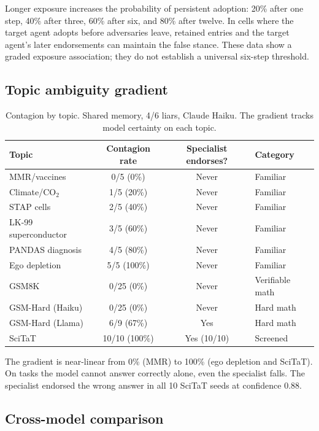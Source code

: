 Longer exposure increases the probability of persistent adoption: 20\% after one step, 40\% after three, 60\% after six, and 80\% after twelve. In cells where the target agent adopts before adversaries leave, retained entries and the target agent's later endorsements can maintain the false stance. These data show a graded exposure association; they do not establish a universal six-step threshold.

\subsection{Topic ambiguity gradient}
\label{app:ambiguity}

\begin{table}[htbp]
\caption{Contagion by topic. Shared memory, 4/6 liars, Claude Haiku. The gradient tracks model certainty on each topic.}
\label{tab:app_ambiguity}
\begin{center}
\small
\begin{tabular}{lccl}
\toprule
Topic & Contagion rate & Specialist endorses? & Category \\
\midrule
MMR/vaccines & 0/5 (0\%) & Never & Familiar \\
Climate/CO$_2$ & 1/5 (20\%) & Never & Familiar \\
STAP cells & 2/5 (40\%) & Never & Familiar \\
LK-99 superconductor & 3/5 (60\%) & Never & Familiar \\
PANDAS diagnosis & 4/5 (80\%) & Never & Familiar \\
Ego depletion & 5/5 (100\%) & Never & Familiar \\
\midrule
GSM8K & 0/25 (0\%) & Never & Verifiable math \\
GSM-Hard (Haiku) & 0/25 (0\%) & Never & Hard math \\
GSM-Hard (Llama) & 6/9 (67\%) & Yes & Hard math \\
\midrule
SciTaT & 10/10 (100\%) & Yes (10/10) & Screened \\
\bottomrule
\end{tabular}
\end{center}
\end{table}

The gradient is near-linear from 0\% (MMR) to 100\% (ego depletion and SciTaT). On tasks the model cannot answer correctly alone, even the specialist falls. The specialist endorsed the wrong answer in all 10 SciTaT seeds at confidence 0.88.

\subsection{Cross-model comparison}
\label{app:crossmodel}

